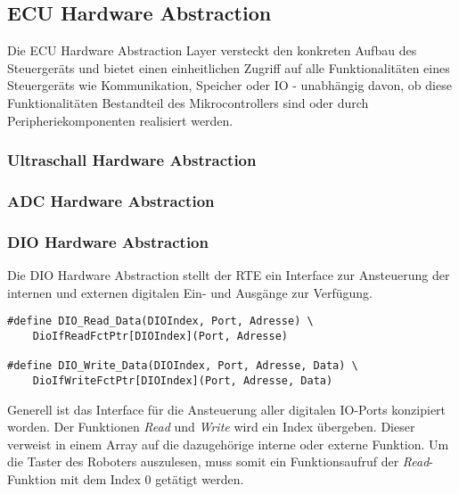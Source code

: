 \subsection{ECU Hardware Abstraction}

Die ECU Hardware Abstraction Layer versteckt den konkreten Aufbau des Steuergeräts und bietet einen einheitlichen Zugriff auf alle Funktionalitäten eines Steuergeräts wie Kommunikation, Speicher oder IO - unabhängig davon, ob diese Funktionalitäten Bestandteil des Mikrocontrollers sind oder durch Peripheriekomponenten realisiert werden.


\subsubsection{Ultraschall Hardware Abstraction}


\subsubsection{ADC Hardware Abstraction}

\subsubsection{DIO Hardware Abstraction} \label{dio}

Die DIO Hardware Abstraction stellt der RTE ein Interface zur Ansteuerung der internen und externen digitalen Ein- und Ausgänge zur Verfügung.

\begin{lstlisting}[frame=single,caption={DIO Interface},captionpos=b]  
#define DIO_Read_Data(DIOIndex, Port, Adresse) \
	DioIfReadFctPtr[DIOIndex](Port, Adresse)
	
#define DIO_Write_Data(DIOIndex, Port, Adresse, Data) \
	DioIfWriteFctPtr[DIOIndex](Port, Adresse, Data)
\end{lstlisting}\newline\newline
%
%
Generell ist das Interface für die Ansteuerung aller digitalen IO-Ports konzipiert worden.
Der Funktionen \textit{Read} und \textit{Write} wird ein Index übergeben. Dieser verweist in einem Array auf die dazugehörige interne oder externe Funktion.\newline\newline
%
Um die Taster des Roboters auszulesen, muss somit ein Funktionsaufruf der \textit{Read}-Funktion mit dem Index 0 getätigt werden.

